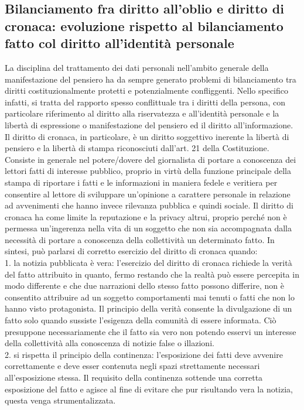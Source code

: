 \subsection{Bilanciamento fra diritto all'oblio e diritto di cronaca: evoluzione rispetto al bilanciamento fatto col diritto all'identità personale}
La disciplina del trattamento dei dati personali nell'ambito generale della manifestazione del pensiero ha da sempre generato problemi di bilanciamento tra diritti costituzionalmente protetti e potenzialmente confliggenti.
Nello specifico infatti, si tratta del rapporto spesso conflittuale tra i diritti della persona, con particolare riferimento al diritto alla riservatezza e all'identità personale e la libertà di espressione o manifestazione del pensiero ed il diritto all'informazione. Il diritto di cronaca, in particolare, è un diritto soggettivo inerente la libertà di pensiero e la libertà di stampa riconosciuti dall'art. 21  della Costituzione. Consiste in generale nel potere/dovere del giornalista di portare a conoscenza dei lettori fatti di interesse pubblico, proprio in virtù della funzione principale della stampa di riportare i fatti e le informazioni in maniera fedele e veritiera per consentire al lettore di sviluppare un'opinione a carattere personale in relazione ad avvenimenti che hanno invece rilevanza pubblica e quindi sociale.
Il diritto di cronaca ha come limite la reputazione e la privacy altrui, proprio perché non è permessa un'ingerenza nella vita di un soggetto che non sia accompagnata dalla necessità di portare a conoscenza della collettività un determinato fatto.
In sintesi, può parlarsi di corretto esercizio del diritto di cronaca quando:
\\1. la notizia pubblicata è vera: l'esercizio del diritto di cronaca richiede la verità del fatto attribuito in quanto, fermo restando che la realtà può essere percepita in modo differente e che due narrazioni dello stesso fatto possono differire, non è consentito attribuire ad un soggetto comportamenti mai tenuti o fatti che non lo hanno visto protagonista.
Il principio della verità consente la divulgazione di un fatto solo quando sussiste l'esigenza della comunità di essere informata. Ciò presuppone necessariamente che il fatto sia vero non potendo esservi un interesse della collettività alla conoscenza di notizie false o illazioni.
\\2. si rispetta il principio della continenza: l'esposizione dei fatti deve avvenire correttamente e deve esser contenuta negli spazi strettamente necessari all'esposizione stessa. Il requisito della continenza sottende una corretta esposizione del fatto e agisce al fine di evitare che pur risultando vera la notizia, questa venga strumentalizzata.
